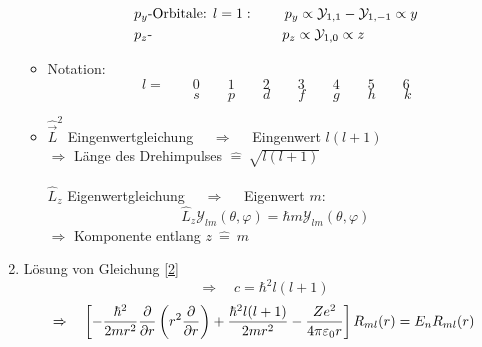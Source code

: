 \begin{enumerate}[(1)]
\begin{itemize}
\begin{align*}
		&p_y \textrm{-Orbitale: } l = 1 :  \qquad \, p_y \propto \mathcal{Y}_{1,1} - \mathcal{Y}_{1,-1} \propto y\\
		&p_z \textrm{- } \qquad \qquad \qquad \qquad \quad p_z \propto \mathcal{Y}_{1,0} \propto z
		\end{align*}
		\item Notation:
		\begin{equation*}
		l = \qquad 0 \qquad 1 \qquad 2 \qquad 3 \qquad 4 \qquad 5 \qquad 6
		\end{equation*}
		\begin{equation*}
		\qquad \qquad s \qquad p \qquad d \qquad f \qquad g \qquad h \qquad k \
		\end{equation*}
		\item $ \hat{\vec{L}}^2 $ Eingenwertgleichung $ \quad \Rightarrow \quad $ Eingenwert $ l(l+1) $\\[5pt]
		$ \Rightarrow $ Länge des Drehimpulses $ \widehat{=} \ \sqrt{l(l+1)} $\\
		\\[5pt]
		$ \hat{L}_z $ Eigenwertgleichung $ \quad \Rightarrow \quad $ Eigenwert $ m $:
		\begin{equation*}
		\hat{L}_z \mathcal{Y}_{lm}(\theta,\varphi) = \hbar m \mathcal{Y}_{lm}(\theta,\varphi)
		\end{equation*}
		$ \Rightarrow $ Komponente entlang $ z \ \widehat{=} \ m $
	\end{itemize}
	\item Lösung von Gleichung \eqref{2}
	\begin{equation*}
	\Rightarrow \quad c = \hbar^2 l(l+1)
	\end{equation*}
	\begin{equation*}
	\Rightarrow \quad \left[-\frac{\hbar^2}{2mr^2} \frac{\partial }{\partial r} \left(r^2 \frac{\partial }{\partial r}\right) + \frac{\hbar^2 l(l+1)}{2mr^2} - \frac{Ze^2}{4 \pi \varepsilon_0 r}\right] R_{ml} (r) = E_n R_{ml} (r)
	\end{equation*}

\end{enumerate}
